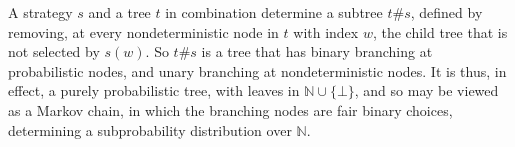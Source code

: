 A strategy $s$ and a tree $t$ in combination determine a subtree $t\#s$, defined by 
removing, at every nondeterministic node in $t$ with index $w$, the child tree that is not selected by $s(w)$. So $t\#s$ is a tree that has binary branching at probabilistic nodes, and unary branching at nondeterministic nodes. It is thus, in effect, a purely probabilistic tree, with leaves in $\mathbb{N}\cup\{\bot\}$, and so may be viewed as a Markov chain, in which the branching nodes are fair binary choices, determining  a subprobability distribution over $\mathbb{N}$. 


